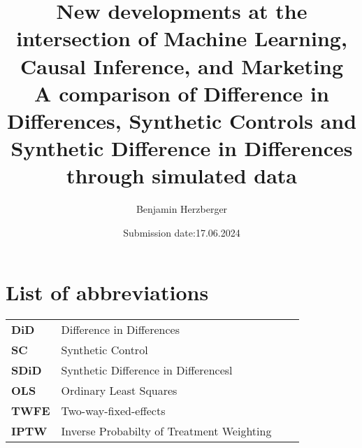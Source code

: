 \documentclass[8pt]{article}
\title{New developments at the intersection of Machine Learning, Causal Inference, and Marketing\\
\vspace{0.5cm}
\large A comparison of Difference in Differences, Synthetic Controls and Synthetic Difference in Differences through simulated data}
\date{Submission date:17.06.2024}
\author{Benjamin Herzberger}
\begin{document}
\maketitle
\newpage
\doublespacing
\renewcommand{\contentsname}{Table of contents}
\tableofcontents

\newpage
{}

\section*{List of abbreviations}
\begin{table}[!h]
\raggedright
\begin{tabular}{llll}
\textbf{DiD}        & Difference in Differences                   	&   & \\
\textbf{SC}         & Synthetic Control                    		&  &  \\
\textbf{SDiD}      & Synthetic Difference in Differencesl        &  &   \\
\textbf{OLS}       & Ordinary Least Squares                  	&  &   \\
\textbf{TWFE}    & Two-way-fixed-effects                     	&  &   \\
\textbf{IPTW}     &	Inverse Probabilty of Treatment Weighting
\end{tabular}
\end{table}

\newpage
{}
\setcounter{section}{0}
\onehalfspacing
\end{document}
